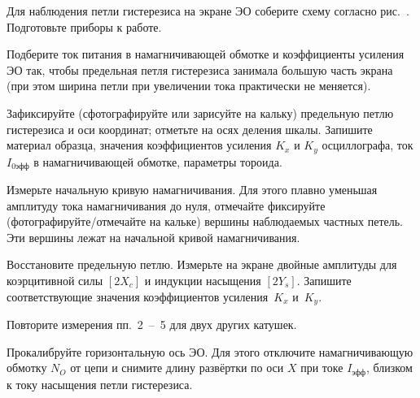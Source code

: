 \begin{lab:task}



\item
Для наблюдения петли гистерезиса на экране ЭО соберите схему согласно
рис.~. Подготовьте приборы к работе.

\item
Подберите ток питания в намагничивающей обмотке и коэффициен­ты усиления ЭО так,
чтобы предельная петля гистерезиса занимала большую часть экрана (при этом
ширина петли при увеличении тока практически не меняется).

\item
Зафиксируйте (сфотографируйте или зарисуйте на кальку)
предельную петлю гистерезиса и оси координат; отметьте на осях деления
шкалы. Запишите материал образца, значения коэффициентов усиления
$K_x$ и $K_y$ осциллографа, ток $I_\text{0эфф}$ в намагничивающей обмотке,
параметры тороида.

\item
Измерьте начальную кривую намагничивания. Для этого плавно уменьшая амплитуду тока
намагничивания до нуля, отмечайте фиксируйте
(фотографируйте/отмечайте на кальке) вершины наблюдаемых частных петель.
Эти вершины лежат на начальной кривой намагничи­вания.

\item Восстановите предельную петлю. Измерьте на экране
двойные амплитуды для коэрцитивной силы $[2X_c]$ и индукции насыщения
$[2Y_s]$. Запишите соответствующие значения коэффициентов усиления~$K_x$ и~$K_y$.

\item Повторите измерения пп.~2~--~5 для двух других катушек.


\item
Прокалибруйте горизонтальную ось ЭО. Для этого отключите на­магничивающую
обмотку $N_O$ от цепи и снимите длину развёртки по оси $X$ при токе
$I_\text{эфф}$, близком к току насыщения петли гистерезиса.


\end{lab:task}
